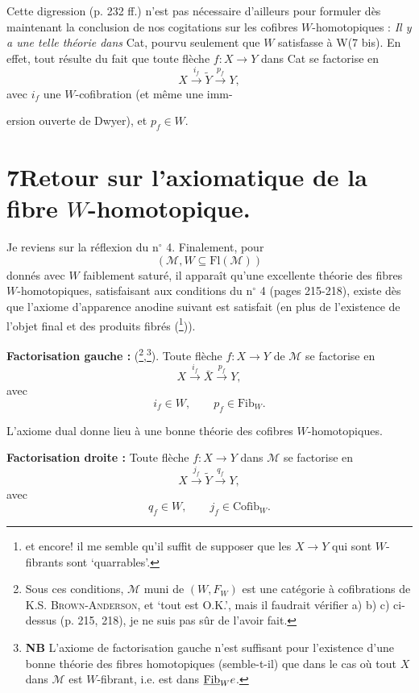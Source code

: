 Cette digression (p. 232 ff.) n'est pas nécessaire d'ailleurs pour formuler dès maintenant la conclusion de nos cogitations sur les cofibres $W$-homotopiques : \textit{Il y a une telle théorie dans} Cat, pourvu seulement que $W$ satisfasse à W(7 bis). En effet, tout résulte du fait que toute flèche $f : X \longrightarrow Y$ dans Cat se factorise en
\[
X \xrightarrow{i_f} \tilde{Y} \xrightarrow{p_f} Y,
\]
avec $i_f$ une $W$-cofibration (et même une imm-


ersion ouverte de Dwyer), et $p_f \in W$. %

\section*{7\quad Retour sur l'axiomatique de la fibre $W$-homotopique.}

Je reviens sur la réflexion du n$^\circ$ 4. Finalement, pour
\[
(\mathcal{M}, W \subseteq \mathrm{Fl}(\mathcal{M}))
\]
donnés avec $W$ faiblement saturé, il apparaît qu'une excellente théorie des fibres $W$-homotopiques, satisfaisant aux conditions  du n$^\circ$ 4 (pages 215-218), existe dès que l'axiome d'apparence anodine suivant est satisfait (en plus de l'existence de l'objet final et des produits fibrés (\footnote[128]{et encore! il me semble qu'il suffit de supposer que les $X \longrightarrow Y$ qui sont $W$-fibrants sont `quarrables'.})).

\textbf{Factorisation gauche :} (\footnote[129]{Sous ces conditions, $\mathcal{M}$ muni de $(W, F_W)$ est une catégorie à cofibrations de K.S. \textsc{Brown-Anderson}, et `tout est O.K.', mais il faudrait vérifier a) b) c) ci-dessus (p. 215, 218), je ne suis pas sûr de l'avoir fait.},\footnote[130]{\textbf{NB} L'axiome de factorisation gauche n'est suffisant pour l'existence d'une bonne théorie des fibres homotopiques (semble-t-il) que dans le cas où tout $X$ dans $\mathcal{M}$ est $W$-fibrant, i.e. est dans $\underline{\mathrm{Fib}}_W e$.}). Toute flèche $f : X \longrightarrow Y$ de $\mathcal{M}$ se factorise en
\[
X \xrightarrow{i_f} \bar{X} \xrightarrow{p_f} Y,
\]
avec
\[
i_f \in W, \qquad p_f \in \mathrm{Fib}_W.
\]

L'axiome dual donne lieu à une bonne théorie des cofibres $W$-homotopiques.

\textbf{Factorisation droite :} Toute flèche $f : X \longrightarrow Y$ dans $\mathcal{M}$ se factorise en
\[
X \xrightarrow{j_f} \tilde{Y} \xrightarrow{q_f} Y,
\]
avec
\[
q_f \in W, \qquad j_f \in \mathrm{Cofib}_W.
\]


